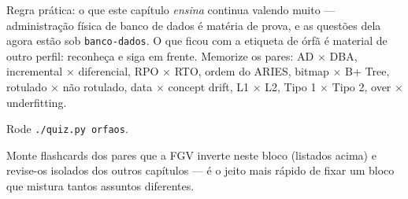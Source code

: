 \begin{jacaiu}
Regra prática: o que este capítulo \emph{ensina} continua valendo muito ---
administração física de banco de dados é matéria de prova, e as questões dela
agora estão sob \texttt{banco-dados}. O que ficou com a etiqueta de órfã é
material de outro perfil: reconheça e siga em frente. Memorize os pares:
AD $\times$ DBA, incremental $\times$ diferencial,
RPO $\times$ RTO, ordem do ARIES, bitmap $\times$ B+ Tree, rotulado $\times$
não rotulado, data $\times$ concept drift, L1 $\times$ L2, Tipo 1 $\times$
Tipo 2, over $\times$ underfitting.

Rode \texttt{./quiz.py orfaos}.
\end{jacaiu}

\begin{comosair}
Monte flashcards dos pares que a FGV inverte neste bloco (listados acima) e
revise-os isolados dos outros capítulos --- é o jeito mais rápido de fixar um
bloco que mistura tantos assuntos diferentes.
\end{comosair}
